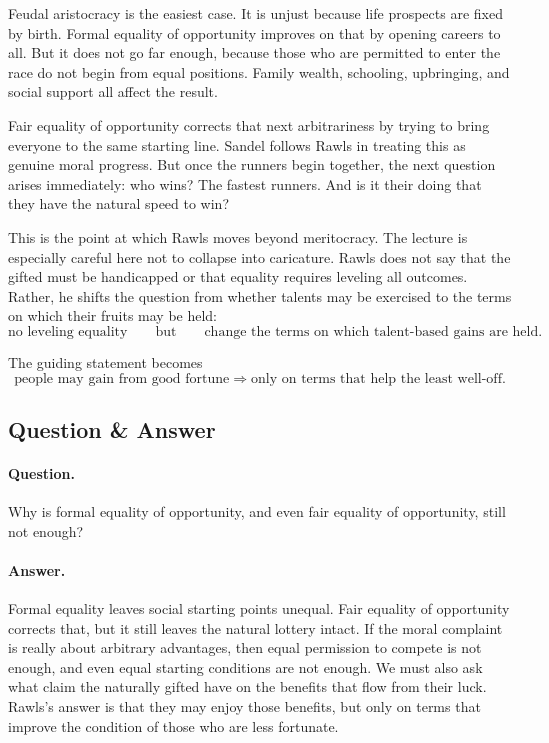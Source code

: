 Feudal aristocracy is the easiest case. It is unjust because life prospects are fixed by birth. Formal equality of opportunity improves on that by opening careers to all. But it does not go far enough, because those who are permitted to enter the race do not begin from equal positions. Family wealth, schooling, upbringing, and social support all affect the result.

Fair equality of opportunity corrects that next arbitrariness by trying to bring everyone to the same starting line. Sandel follows Rawls in treating this as genuine moral progress. But once the runners begin together, the next question arises immediately: who wins? The fastest runners. And is it their doing that they have the natural speed to win?

This is the point at which Rawls moves beyond meritocracy. The lecture is especially careful here not to collapse into caricature. Rawls does not say that the gifted must be handicapped or that equality requires leveling all outcomes. Rather, he shifts the question from whether talents may be exercised to the terms on which their fruits may be held:
\begin{equation}
\text{no leveling equality}
\qquad
\text{but}
\qquad
\text{change the terms on which talent-based gains are held}.
\end{equation}

The guiding statement becomes
\begin{equation}
\text{people may gain from good fortune}
\Longrightarrow
\text{only on terms that help the least well-off}.
\end{equation}

\subsection{Question \& Answer}

\paragraph{Question.} Why is formal equality of opportunity, and even fair equality of opportunity, still not enough?

\paragraph{Answer.} Formal equality leaves social starting points unequal. Fair equality of opportunity corrects that, but it still leaves the natural lottery intact. If the moral complaint is really about arbitrary advantages, then equal permission to compete is not enough, and even equal starting conditions are not enough. We must also ask what claim the naturally gifted have on the benefits that flow from their luck. Rawls's answer is that they may enjoy those benefits, but only on terms that improve the condition of those who are less fortunate.

